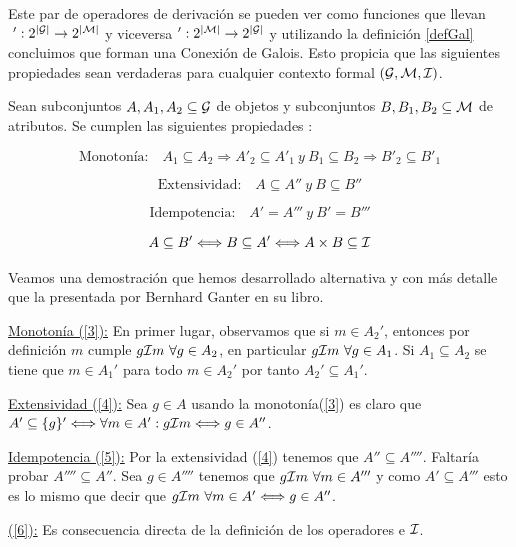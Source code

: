 \documentclass[oneside,openright,titlepage,numbers=noenddot,openany,headinclude,footinclude=true,
cleardoublepage=empty,abstractoff,BCOR=5mm,paper=a4,fontsize=12pt,main=spanish]{scrreprt}
\begin{document}
Este par de operadores de derivación se pueden ver como funciones que llevan $\ ':2^{|\mathcal{G}|} \to 2^{|\mathcal{M}|} $ y viceversa $ ':2^{|\mathcal{M}|}  \to 2^{|\mathcal{G}|}$ y utilizando la definición \ref{defGal} concluimos que forman una Conexión de Galois. Esto propicia que las siguientes propiedades sean verdaderas para cualquier contexto formal $(\mathcal{G},\mathcal{M},\mathcal{I})$.

\begin{proposition} \label{propositionmonotony} \cite{ganter_formal_1999} Sean subconjuntos $A, A_{1},A_{2} \subseteq \mathcal{G}$ de objetos y subconjuntos $B,B_{1},B_{2} \subseteq \mathcal{M}$ de atributos. Se cumplen las siguientes propiedades :


\begin{equation}\label{3}
\text{Monotonía: } \ \ \ A_{1} \subseteq A_{2} \Longrightarrow  A'_{2} \subseteq A'_{1} \  y \  B_{1} \subseteq B_{2} \Longrightarrow B'_{2} \subseteq B'_{1} 
\end{equation}

\begin{equation}\label{4}
\text{Extensividad: } \ \ \ A \subseteq A'' \ y \  B \subseteq B''
\end{equation}

\begin{equation}\label{5}
\text{Idempotencia: } \ \ \ A'= A''' \  y\  B'=B'''
\end{equation}


\begin{equation}\label{6}
 A \subseteq B'\Longleftrightarrow B \subseteq A' \Longleftrightarrow A \times B \subseteq \mathcal{I} 
\end{equation}

\end{proposition} 

Veamos una demostración que hemos desarrollado alternativa y con más detalle que la presentada por Bernhard Ganter \cite{ganter_formal_1999} en su libro.

\begin{proofs}

\underline{Monotonía (\ref{3}):} En primer lugar, observamos que si $m \in A_2'$, entonces por definición $m$ cumple $g\mathcal{I} m \ \forall g \in A_2$, en particular $g \mathcal{I} m \ \forall g \in A_1$. Si $A_1 \subseteq A_2$ se tiene que $m \in A_1'$ para todo $m \in A_2'$ por tanto $A_2'\subseteq A_1'$.

\underline{Extensividad (\ref{4}):} Sea $g \in A$ usando la monotonía(\ref{3}) es claro que $A' \subseteq \{g\}'  \Longleftrightarrow \forall m \in A': g\mathcal{I} m  \Longleftrightarrow g \in A''$.

\underline{Idempotencia (\ref{5}):} Por la extensividad (\ref{4}) tenemos que $A''\subseteq A''''$. Faltaría probar $A''''\subseteq A''$. Sea $g \in A''''$ tenemos que $g \mathcal{I} m \ \forall m \in A'''$ y como $A'\subseteq A'''$ esto es lo mismo que decir que $g \I m \ \forall m \in A' \Longleftrightarrow g \in A'' $.

\underline{(\ref{6}):} Es consecuencia directa de la definición de los operadores e $\mathcal{I}$.
\end{proofs}
\end{document}
